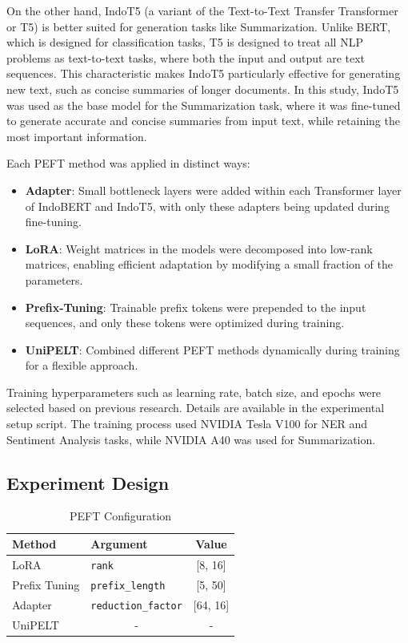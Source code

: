 On the other hand, IndoT5 (a variant of the Text-to-Text Transfer Transformer or T5) is better suited for generation tasks like Summarization. Unlike BERT, which is designed for classification tasks, T5 is designed to treat all NLP problems as text-to-text tasks, where both the input and output are text sequences. This characteristic makes IndoT5 particularly effective for generating new text, such as concise summaries of longer documents. In this study, IndoT5 was used as the base model for the Summarization task, where it was fine-tuned to generate accurate and concise summaries from input text, while retaining the most important information.

Each PEFT method was applied in distinct ways:
\begin{itemize}
    \item \textbf{Adapter}: Small bottleneck layers were added within each Transformer layer of IndoBERT and IndoT5, with only these adapters being updated during fine-tuning.
    \item \textbf{LoRA}: Weight matrices in the models were decomposed into low-rank matrices, enabling efficient adaptation by modifying a small fraction of the parameters.
    \item \textbf{Prefix-Tuning}: Trainable prefix tokens were prepended to the input sequences, and only these tokens were optimized during training.
    \item \textbf{UniPELT}: Combined different PEFT methods dynamically during training for a flexible approach.
\end{itemize}

Training hyperparameters such as learning rate, batch size, and epochs were selected based on previous research. Details are available in the experimental setup script. The training process used NVIDIA Tesla V100 for NER and Sentiment Analysis tasks, while NVIDIA A40 was used for Summarization.


\subsection{Experiment Design}

\begin{table}[htbp]
    \centering
    \caption{PEFT Configuration}
    \label{table:peft-configuration}
    \begin{tabular}{l|l|c}
        \toprule
        \textbf{Method} & \textbf{Argument} & \textbf{Value} \\
        \midrule
        LoRA & \texttt{rank} & [8, 16] \\
        Prefix Tuning & \texttt{prefix\_length} & [5, 50] \\
        Adapter & \texttt{reduction\_factor} & [64, 16] \\
        UniPELT & \multicolumn{1}{c|}{-}  & - \\
        \bottomrule
    \end{tabular}
\end{table}

